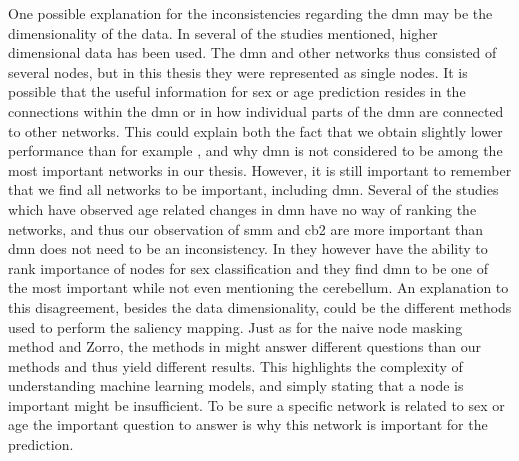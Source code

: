 One possible explanation for the inconsistencies regarding the \acrshort{dmn} may be the dimensionality of the data. In several of the studies mentioned, higher dimensional data has been used. The \acrshort{dmn} and other networks thus consisted of several nodes, but in this thesis they were represented as single nodes. It is possible that the useful information for sex or age prediction resides in the connections within the \acrshort{dmn} or in how individual parts of the \acrshort{dmn} are connected to other networks. This could explain both the fact that we obtain slightly lower performance than for example \cite{arslan, understanding_gnn}, and why \acrshort{dmn} is not considered to be among the most important networks in our thesis. However, it is still important to remember that we find all networks to be important, including \acrshort{dmn}. Several of the studies which have observed age related changes in \acrshort{dmn} \cite{meier_svm, song_reorganizational, tomasi_aging} have no way of ranking the networks, and thus our observation of \acrshort{smm} and \acrshort{cb2} are more important than \acrshort{dmn} does not need to be an inconsistency. In \cite{arslan, understanding_gnn} they however have the ability to rank importance of nodes for sex classification and they find \acrshort{dmn} to be one of the most important while not even mentioning the cerebellum. An explanation to this disagreement, besides the data dimensionality, could be the different methods used to perform the saliency mapping. Just as for the naive node masking method and Zorro, the methods in \cite{understanding_gnn, arslan} might answer different questions than our methods and thus yield different results. This highlights the complexity of understanding machine learning models, and simply stating that a node is important might be insufficient. To be sure a specific network is related to sex or age the important question to answer is why this network is important for the prediction. 

